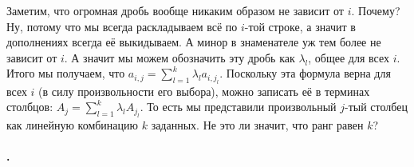 \documentclass{article}
\begin{document}
\begin{itemize}
\begin{Proof}
$$            $$
            Заметим, что огромная дробь вообще никаким образом не зависит от $i$. Почему? Ну, потому что мы всегда раскладываем всё по $i$-той строке, а значит в дополнениях всегда её выкидываем. А минор в знаменателе уж тем более не зависит от $i$. А значит мы можем обозначить эту дробь как $\lambda_l$, общее для всех $i$. Итого мы получаем, что $a_{i,j}=\sum_{l=1}^k\lambda_la_{i,j_l}$. Поскольку эта формула верна для всех $i$ (в силу произвольности его выбора), можно записать её в терминах столбцов: $A_j=\sum_{l=1}^k\lambda_lA_{j_l}$. То есть мы представили произвольный $j$-тый столбец как линейную комбинацию $k$ заданных. Не это ли значит, что ранг равен $k$?
        \end{Proof}
    \end{itemize}
    \paragraph{.}
\end{document}
